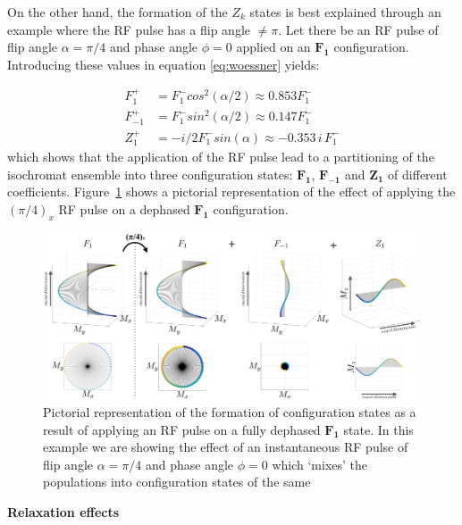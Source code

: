 \hfill

On the other hand, the formation of the $Z_{k}$ states is best explained through an example where the RF pulse has a flip angle $\neq \pi$.
Let there be an RF pulse of flip angle $\alpha = \pi/4$ and phase angle $\phi = 0$ applied on an $\bm{F_1}$ configuration.
Introducing these values in equation \ref{eq:woessner} yields:

\begin{equation}
\begin{split}
    F_{1}^+  &= F_{1}^- cos^2(\alpha/2) \approx 0.853 F_{1}^- \\
    F_{-1}^+ &= F_{1}^- sin^2(\alpha/2) \approx 0.147 F_{1}^-   \\
    Z_{1}^+  &= - i/2 F_{1}^- sin(\alpha)  \approx - 0.353 \, i \, F_{1}^-
\end{split}
\end{equation}
which shows that the application of the RF pulse lead to a partitioning of the isochromat ensemble into three configuration states: $\bm{F_1}$, $\bm{F_{-1}}$ and $\bm{Z_1}$ of different coefficients.
Figure~\ref{fig:RFPulseinEPG} shows a pictorial representation of the effect of applying the $(\pi/4)_x$ RF pulse on a dephased $\bm{F_1}$ configuration.

\begin{figure}[ht]
    \centering
    \includegraphics[angle=0,width=1\textwidth, keepaspectratio]{images/mrf/RFPulseinEPG}
    \caption{Pictorial representation of the formation of configuration states as a result of applying an RF pulse on a fully dephased $\bm{F_1}$ state.
    In this example we are showing the effect of an instantaneous RF pulse of flip angle $\alpha = \pi/4$ and phase angle $\phi = 0$ which `mixes' the populations into configuration states of the same 
    }
    \label{fig:RFPulseinEPG}
\end{figure}

\hfill

\textbf{Relaxation effects} 

